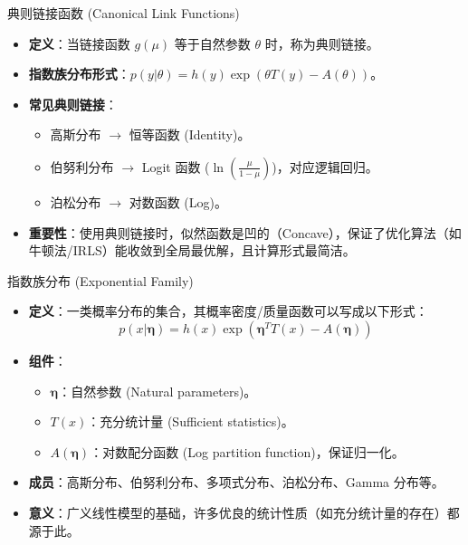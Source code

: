 \documentclass[12pt, aspectratio=169]{beamer}
\begin{document}
\begin{frame}{典则链接函数 (Canonical Link Functions)}
    \begin{itemize}
        \item \textbf{定义}：当链接函数 $g(\mu)$ 等于自然参数 $\theta$ 时，称为典则链接。
        \item \textbf{指数族分布形式}：$p(y|\theta) = h(y)\exp(\theta T(y) - A(\theta))$。
        \item \textbf{常见典则链接}：
        \begin{itemize}
            \item 高斯分布 $\to$ 恒等函数 (Identity)。
            \item 伯努利分布 $\to$ Logit 函数 ($\ln(\frac{\mu}{1-\mu})$)，对应逻辑回归。
            \item 泊松分布 $\to$ 对数函数 (Log)。
        \end{itemize}
        \item \textbf{重要性}：使用典则链接时，似然函数是凹的（Concave），保证了优化算法（如牛顿法/IRLS）能收敛到全局最优解，且计算形式最简洁。
    \end{itemize}
\end{frame}

\begin{frame}{指数族分布 (Exponential Family)}
    \begin{itemize}
        \item \textbf{定义}：一类概率分布的集合，其概率密度/质量函数可以写成以下形式：
        $$ p(x|\boldsymbol{\eta}) = h(x) \exp\left( \boldsymbol{\eta}^T T(x) - A(\boldsymbol{\eta}) \right) $$
        \item \textbf{组件}：
        \begin{itemize}
            \item $\boldsymbol{\eta}$：自然参数 (Natural parameters)。
            \item $T(x)$：充分统计量 (Sufficient statistics)。
            \item $A(\boldsymbol{\eta})$：对数配分函数 (Log partition function)，保证归一化。
        \end{itemize}
        \item \textbf{成员}：高斯分布、伯努利分布、多项式分布、泊松分布、Gamma 分布等。
        \item \textbf{意义}：广义线性模型的基础，许多优良的统计性质（如充分统计量的存在）都源于此。
    \end{itemize}
\end{frame}
\end{document}
